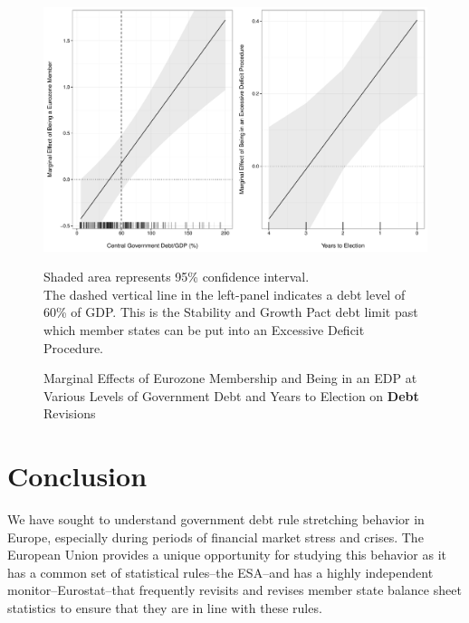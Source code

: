 \documentclass[]{article}
\begin{document}
\begin{figure}
    \caption{Marginal Effects of Eurozone Membership and Being in an EDP at Various Levels of Government Debt and Years to Election on \textbf{Debt} Revisions}
    \label{me_debt_edp_elect}

    \begin{center}
        \includegraphics[scale=0.45]{figures/edp_debt_elect_me.pdf}
    \end{center}

	{\scriptsize{Shaded area represents 95\% confidence interval.\\
    The dashed vertical line in the left-panel indicates a debt level of 60\% of GDP. This is the Stability and Growth Pact debt limit past which member states can be put into an Excessive Deficit Procedure.}}

\end{figure}

\begin{landscape}
    
\end{landscape}


\section{Conclusion}

We have sought to understand government debt rule stretching behavior in Europe, especially during periods of financial market stress and crises. The European Union provides a unique opportunity for studying this behavior as it has a common set of statistical rules--the ESA--and has a highly independent monitor--Eurostat--that frequently revisits and revises member state balance sheet statistics to ensure that they are in line with these rules.
\end{document}
